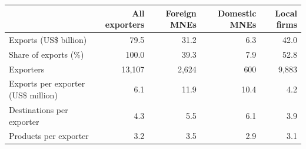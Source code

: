 \begin{tabular}{lrrrr}
\toprule
 & All exporters & Foreign MNEs & Domestic MNEs & Local firms \\
\midrule
Exports (US\$ billion) & 79.5 & 31.2 & 6.3 & 42.0 \\
Share of exports (\%) & 100.0 & 39.3 & 7.9 & 52.8 \\
Exporters & 13,107 & 2,624 & 600 & 9,883 \\
Exports per exporter (US\$ million) & 6.1 & 11.9 & 10.4 & 4.2 \\
Destinations per exporter & 4.3 & 5.5 & 6.1 & 3.9 \\
Products per exporter & 3.2 & 3.5 & 2.9 & 3.1 \\
\bottomrule
\end{tabular}
